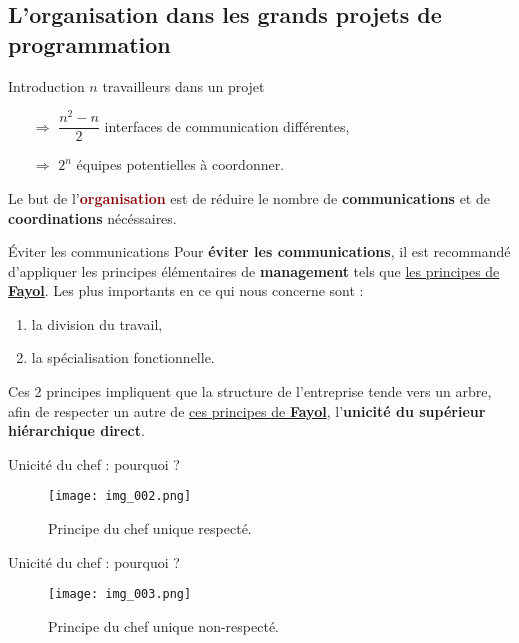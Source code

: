 \documentclass{beamer}
\newcommand{\red}[1]{\textcolor{darkred}{#1}}
\begin{document}
\subsection{L'organisation dans les grands projets de programmation}

\begin{frame}{Introduction}
$n$ travailleurs dans un projet 
\begin{itemize}
\item[$\Rightarrow$] $\dfrac{n^2-n}{2}$ interfaces de communication différentes,
\item[$\Rightarrow$] $2^n$ équipes potentielles à coordonner. \\
\end{itemize}
$ $\\
Le but de l'\textbf{\red{organisation}} est de réduire le nombre de \textbf{communications} et de \textbf{coordinations} 
nécéssaires.
\end{frame}

\begin{frame}{Éviter les communications}
Pour \textbf{éviter les communications}, il est recommandé d'appliquer les principes élémentaires de \textbf{management} tels que 
\href{http://blogconsultantfrance.blogspot.com/2008/08/les-14-principes-du-management-de-henri.html}{les principes de 
\textbf{Fayol}}. Les plus importants en ce qui nous concerne sont : 
\begin{enumerate}
\item la division du travail,
\item la spécialisation fonctionnelle.
\end{enumerate}
Ces 2 principes impliquent que la structure de l'entreprise tende vers un arbre, afin de respecter un autre de 
\href{http://blogconsultantfrance.blogspot.com/2008/08/les-14-principes-du-management-de-henri.html}{ces principes de 
\textbf{Fayol}}, l'\textbf{unicité du supérieur hiérarchique direct}.
\end{frame}

\begin{frame}{Unicité du chef : pourquoi ?}
\begin{figure}
	\begin{center}
	\texttt{[image: img\_002.png]}
	\caption{Principe du chef unique respecté.}
	\end{center}	
\end{figure}
\end{frame}

\begin{frame}{Unicité du chef : pourquoi ?}
\begin{figure}
	\begin{center}
	\texttt{[image: img\_003.png]}
	\caption{Principe du chef unique non-respecté.}
	\end{center}	
\end{figure}
\end{frame}
\end{document}
